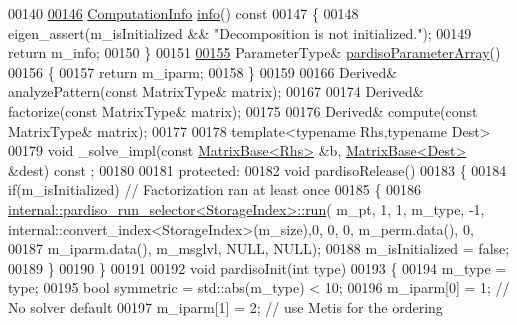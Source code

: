 \begin{DoxyCode}
00140   
\hyperlink{class_eigen_1_1_pardiso_impl_a7dce1175518593e33d32e30ab0ffee3b}{00146}     \hyperlink{group__enums_ga85fad7b87587764e5cf6b513a9e0ee5e}{ComputationInfo} \hyperlink{class_eigen_1_1_pardiso_impl_a7dce1175518593e33d32e30ab0ffee3b}{info}()\textcolor{keyword}{ const}
00147 \textcolor{keyword}{    }\{
00148       eigen\_assert(m\_isInitialized && \textcolor{stringliteral}{"Decomposition is not initialized."});
00149       \textcolor{keywordflow}{return} m\_info;
00150     \}
00151 
\hyperlink{class_eigen_1_1_pardiso_impl_a42a7983796076edc52e0e8d2869610ec}{00155}     ParameterType& \hyperlink{class_eigen_1_1_pardiso_impl_a42a7983796076edc52e0e8d2869610ec}{pardisoParameterArray}()
00156     \{
00157       \textcolor{keywordflow}{return} m\_iparm;
00158     \}
00159     
00166     Derived& analyzePattern(\textcolor{keyword}{const} MatrixType& matrix);
00167     
00174     Derived& factorize(\textcolor{keyword}{const} MatrixType& matrix);
00175 
00176     Derived& compute(\textcolor{keyword}{const} MatrixType& matrix);
00177 
00178     \textcolor{keyword}{template}<\textcolor{keyword}{typename} Rhs,\textcolor{keyword}{typename} Dest>
00179     \textcolor{keywordtype}{void} \_solve\_impl(\textcolor{keyword}{const} \hyperlink{group___core___module_class_eigen_1_1_matrix_base}{MatrixBase<Rhs>} &b, \hyperlink{group___core___module_class_eigen_1_1_matrix_base}{MatrixBase<Dest>} &dest) \textcolor{keyword}{const}
      ;
00180 
00181   \textcolor{keyword}{protected}:
00182     \textcolor{keywordtype}{void} pardisoRelease()
00183     \{
00184       \textcolor{keywordflow}{if}(m\_isInitialized) \textcolor{comment}{// Factorization ran at least once}
00185       \{
00186         \hyperlink{struct_eigen_1_1internal_1_1pardiso__run__selector}{internal::pardiso\_run\_selector<StorageIndex>::run}(
      m\_pt, 1, 1, m\_type, -1, internal::convert\_index<StorageIndex>(m\_size),0, 0, 0, m\_perm.data(), 0,
00187                                                           m\_iparm.data(), m\_msglvl, NULL, NULL);
00188         m\_isInitialized = \textcolor{keyword}{false};
00189       \}
00190     \}
00191 
00192     \textcolor{keywordtype}{void} pardisoInit(\textcolor{keywordtype}{int} type)
00193     \{
00194       m\_type = type;
00195       \textcolor{keywordtype}{bool} symmetric = std::abs(m\_type) < 10;
00196       m\_iparm[0] = 1;   \textcolor{comment}{// No solver default}
00197       m\_iparm[1] = 2;   \textcolor{comment}{// use Metis for the ordering}

\end{DoxyCode}
